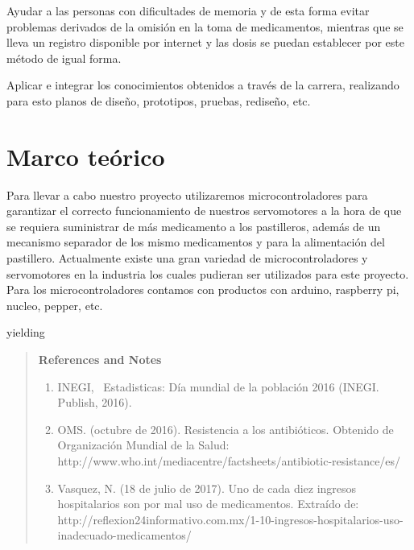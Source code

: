 \documentclass[12pt]{article}
\begin{document}
Ayudar a las personas con dificultades de memoria y de esta forma evitar problemas derivados de la omisi\'on en la toma de medicamentos, mientras que se lleva un registro disponible por internet y las dosis se puedan establecer por este m\'etodo de igual forma.

Aplicar e integrar los conocimientos obtenidos a trav\'es de la carrera, realizando para esto planos de diseño, prototipos, pruebas, redise\~no, etc.


\section*{Marco te\'orico}

Para llevar a cabo nuestro proyecto utilizaremos microcontroladores para garantizar el correcto funcionamiento de nuestros servomotores a la hora de que se requiera suministrar de m\'as medicamento a los pastilleros, adem\'as de un mecanismo separador de los mismo medicamentos y para la alimentaci\'on del pastillero.
Actualmente existe una gran variedad de microcontroladores y servomotores en la industria los cuales pudieran ser  utilizados para este proyecto. Para los microcontroladores contamos con productos con arduino, raspberry pi, nucleo, pepper, etc.


\noindent yielding

\begin{quote}
{\bf References and Notes}

\begin{enumerate}



\item INEGI, {\ Estadisticas: D\'ia mundial de la poblaci\'on 2016\/} (INEGI. Publish, 2016).

\item OMS.{ (octubre de 2016). Resistencia a los antibióticos. Obtenido de Organizaci\'on Mundial de la Salud: http://www.who.int/mediacentre/factsheets/antibiotic-resistance/es/}

\item {Vasquez, N. (18 de julio de 2017). Uno de cada diez ingresos hospitalarios son por mal uso de medicamentos. Extra\'ido de: http://reflexion24informativo.com.mx/1-10-ingresos-hospitalarios-uso-inadecuado-medicamentos/}
\end{enumerate}
\end{quote}
\end{document}
